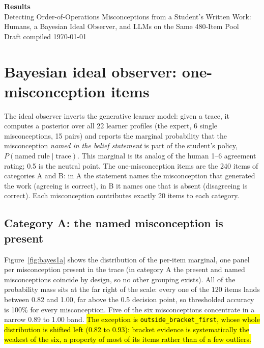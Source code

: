 \documentclass[11pt]{article}
\begin{document}
\begin{center}
{\LARGE\bfseries Results}\\[6pt]
{\large Detecting Order-of-Operations Misconceptions from a Student's Written Work:\\[2pt]
Humans, a Bayesian Ideal Observer, and LLMs on the Same 480-Item Pool}\\[10pt]
{\small Draft compiled \today}
\end{center}

\section{Bayesian ideal observer: one-misconception items}\label{sec:bayes-1misc}

The ideal observer inverts the generative learner model: given a trace, it computes a
posterior over all 22 learner profiles (the expert, 6 single misconceptions, 15 pairs) and
reports the marginal probability that the misconception \emph{named in the belief statement}
is part of the student's policy, $P(\text{named rule} \mid \text{trace})$. This marginal is
its analog of the human 1--6 agreement rating; 0.5 is the neutral point. The one-misconception
items are the 240 items of categories A and B: in A the statement names the misconception that
generated the work (agreeing is correct), in B it names one that is absent (disagreeing is
correct). Each misconception contributes exactly 20 items to each category.

\subsection{Category A: the named misconception is present}\label{sec:bayes-1misc-a}

Figure~\ref{fig:bayes1a} shows the distribution of the per-item marginal, one panel per
misconception present in the trace (in category A the present and named misconceptions
coincide by design, so no other grouping exists). All of the probability mass sits at the far
right of the scale: every one of the 120 items lands between 0.82 and 1.00, far above the 0.5
decision point, so thresholded accuracy is 100\% for every misconception. Five of the six
misconceptions concentrate in a narrow 0.89 to 1.00 band.  \hl{The exception is \texttt{outside\_bracket\_first}, whose whole distribution is shifted left (0.82 to 0.93):
bracket evidence is systematically the weakest of the six, a property of most of its items
rather than of a few outliers.}
\end{document}
